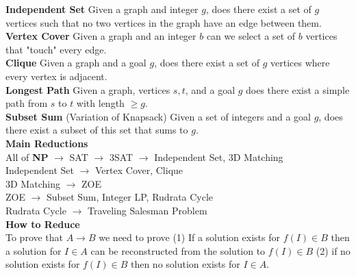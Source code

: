 \documentclass{article}
\begin{document}
\begin{multicols}{2}
\textbf{Independent Set} Given a graph and integer $g$, does there exist a set of $g$ vertices such that no two vertices in the graph have an edge between them.\\
\textbf{Vertex Cover} Given a graph and an integer $b$ can we select a set of $b$ vertices that "touch" every edge.\\
\textbf{Clique} Given a graph and a goal $g$, does there exist a set of $g$ vertices where every vertex is adjacent.\\
\textbf{Longest Path} Given a graph, vertices $s, t$, and a goal $g$ does there exist a simple path from $s$ to $t$ with length $\geq g$. \\
\textbf{Subset Sum} (Variation of Knapsack) Given a set of integers and a goal $g$, does there exist a subset of this set that sums to $g$.\\
\textbf{Main Reductions} \\
All of \textbf{NP} $\rightarrow$ SAT $\rightarrow$ 3SAT $\rightarrow$ Independent Set, 3D Matching\\
Independent Set $\rightarrow$ Vertex Cover, Clique \\
3D Matching $\rightarrow$ ZOE \\
ZOE $\rightarrow$ Subset Sum, Integer LP, Rudrata Cycle\\
Rudrata Cycle $\rightarrow$ Traveling Salesman Problem \\
\textbf{How to Reduce} \\ 
To prove that $A \rightarrow B$ we need to prove (1) If a solution exists for $f(I) \in B$ then a solution for $I \in A$ can be reconstructed from the solution to $f(I) \in B$ (2) if no solution exists for $f(I) \in B$ then no solution exists for $I \in A$. 

\end{multicols}
\end{document}
